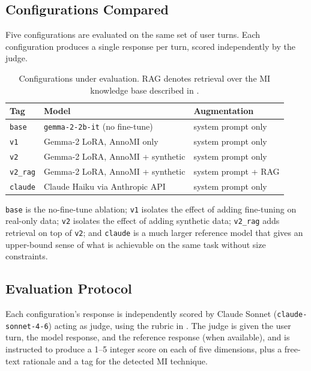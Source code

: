 \subsection{Configurations Compared}

Five configurations are evaluated on the same set of user turns. Each
configuration produces a single response per turn, scored independently by
the judge.

\begin{table}[h]
\centering
\caption{Configurations under evaluation. RAG denotes retrieval over the MI
knowledge base described in .}
\label{tab:configs}
\begin{tabular}{lll}
\toprule
\textbf{Tag} & \textbf{Model} & \textbf{Augmentation} \\
\midrule
\texttt{base}    & \texttt{gemma-2-2b-it} (no fine-tune) & system prompt only \\
\texttt{v1}      & Gemma-2 LoRA, AnnoMI only             & system prompt only \\
\texttt{v2}      & Gemma-2 LoRA, AnnoMI + synthetic      & system prompt only \\
\texttt{v2\_rag} & Gemma-2 LoRA, AnnoMI + synthetic      & system prompt + RAG \\
\texttt{claude}  & Claude Haiku via Anthropic API        & system prompt only \\
\bottomrule
\end{tabular}
\end{table}

\texttt{base} is the no-fine-tune ablation; \texttt{v1} isolates the effect of
adding fine-tuning on real-only data; \texttt{v2} isolates the effect of
adding synthetic data; \texttt{v2\_rag} adds retrieval on top of \texttt{v2};
and \texttt{claude} is a much larger reference model that gives an upper-bound
sense of what is achievable on the same task without size constraints.

\subsection{Evaluation Protocol}

Each configuration's response is independently scored by Claude Sonnet
(\texttt{claude-sonnet-4-6}) acting as judge, using the rubric in
. The judge is given the user turn, the model response, and
the reference response (when available), and is instructed to produce a
1--5 integer score on each of five dimensions, plus a free-text rationale and
a tag for the detected MI technique.

